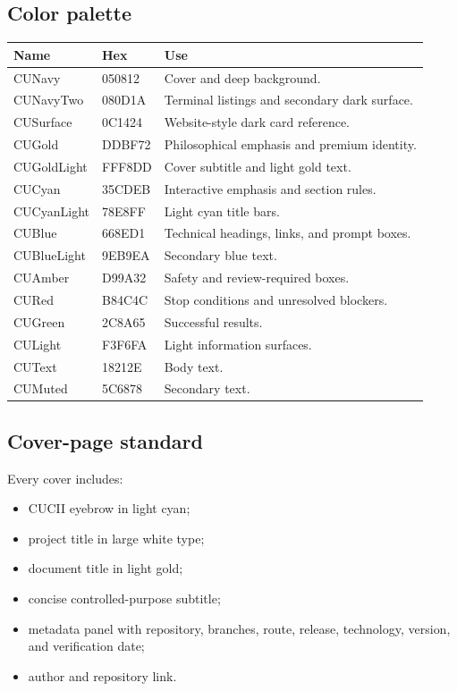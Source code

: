 \documentclass[11pt,letterpaper]{article}
\begin{document}
\subsection{Color palette}

\begin{tabularx}{\textwidth}{L{1.5in}L{1.0in}Y}
\toprule
\textbf{Name} & \textbf{Hex} & \textbf{Use} \\
\midrule
CUNavy & 050812 & Cover and deep background. \\
CUNavyTwo & 080D1A & Terminal listings and secondary dark surface. \\
CUSurface & 0C1424 & Website-style dark card reference. \\
CUGold & DDBF72 & Philosophical emphasis and premium identity. \\
CUGoldLight & FFF8DD & Cover subtitle and light gold text. \\
CUCyan & 35CDEB & Interactive emphasis and section rules. \\
CUCyanLight & 78E8FF & Light cyan title bars. \\
CUBlue & 668ED1 & Technical headings, links, and prompt boxes. \\
CUBlueLight & 9EB9EA & Secondary blue text. \\
CUAmber & D99A32 & Safety and review-required boxes. \\
CURed & B84C4C & Stop conditions and unresolved blockers. \\
CUGreen & 2C8A65 & Successful results. \\
CULight & F3F6FA & Light information surfaces. \\
CUText & 18212E & Body text. \\
CUMuted & 5C6878 & Secondary text. \\
\bottomrule
\end{tabularx}

\subsection{Cover-page standard}

Every cover includes:

\begin{itemize}
    \item CUCII eyebrow in light cyan;
    \item project title in large white type;
    \item document title in light gold;
    \item concise controlled-purpose subtitle;
    \item metadata panel with repository, branches, route, release, technology,
          version, and verification date;
    \item author and repository link.
\end{itemize}
\end{document}

